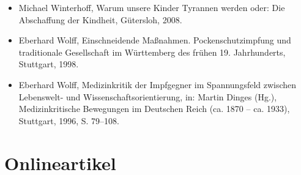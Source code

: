 \documentclass[
    a4paper,
    12pt,
    hyphens,
    chapterprefix=true,
    headheight=33pt,
    footheight=29pt,
    headings=optiontohead, %
]{scrartcl}
\begin{document}
{\begin{itemize}
\item{Michael Winterhoff, Warum unsere Kinder Tyrannen werden oder: Die Abschaffung der Kindheit, Gütersloh, 2008.}
\item{Eberhard Wolff, Einschneidende Maßnahmen. Pockenschutzimpfung und traditionale Gesellschaft im Württemberg des frühen 19. Jahrhunderts, Stuttgart, 1998.}
\item{Eberhard Wolff, Medizinkritik der Impfgegner im Spannungsfeld zwischen Lebenswelt- und Wissenschaftsorientierung, in: Martin Dinges (Hg.), Medizinkritische Bewegungen im Deutschen Reich (ca. 1870 -- ca. 1933), Stuttgart, 1996, S. 79--108.}
\end{itemize}


\newpage

\section{Onlineartikel}

}
\end{document}
